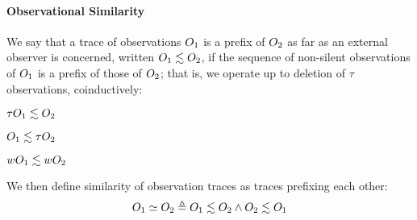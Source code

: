 \documentclass[acmsmall,review,anonymous]{acmart}\settopmatter{printfolios=true,printccs=false,printacmref=false}
\begin{document}
{%

\paragraph*{Observational Similarity}

We say that a trace of observations $O_1$ is a prefix of $O_2$
as far as an external observer is concerned, written \(O_1 \lesssim
O_2\), if the sequence of
non-silent observations of $O_1$ is a prefix of those of
$O_2$; that is, we operate up to deletion of \(\tau\) observations,
coinductively:

\begin{minipage}{.3\textwidth}
  \judgment{}{\(\obsT \lesssim \obsT\)}
\end{minipage}
\begin{minipage}{.3\textwidth}
\judgment{}{\(\tau \lesssim \obsT\)}
\end{minipage}
\begin{minipage}{.3\textwidth}
\end{minipage}

\begin{minipage}{.3\textwidth}
         {\(\tau O_1 \lesssim O_2\)}
\end{minipage}
\begin{minipage}{.3\textwidth}
         {\(O_1 \lesssim \tau O_2\)}
\end{minipage}
\begin{minipage}{.3\textwidth}
         {\(wO_1 \lesssim wO_2\)}
\end{minipage}

\smallskip
We then define similarity of observation traces as traces prefixing each other:
\[O_1 \simeq O_2 \triangleq O_1 \lesssim O_2 \land O_2 \lesssim O_1\]
%

}
\end{document}
